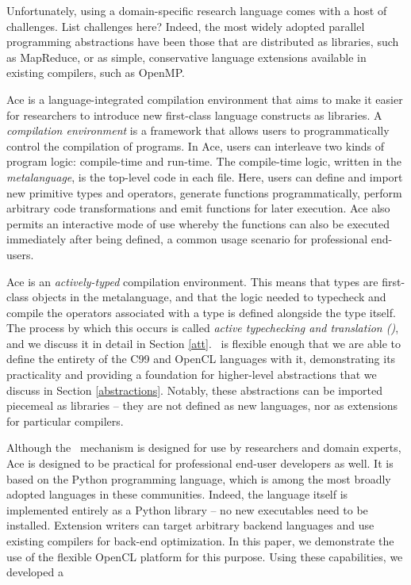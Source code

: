 \documentclass[10pt, conference, compsocconf]{IEEEtran}
\begin{document}
Unfortunately, using a domain-specific research language comes with a host of challenges. {\color{red} List challenges here?} Indeed, the most widely adopted parallel programming abstractions have been those that are distributed as libraries, such as MapReduce, or as simple, conservative language extensions available in existing compilers, such as OpenMP. 

Ace is a language-integrated compilation environment that aims to make it easier for researchers to introduce new first-class language constructs as libraries. A {\em compilation environment} is a framework that allows users to programmatically control the compilation of programs. In Ace, users can interleave two kinds of program logic: compile-time and run-time. The compile-time logic, written in the {\em metalanguage}, is the top-level code in each file. Here, users can define and import new primitive types and operators, generate functions programmatically, perform arbitrary code transformations and emit functions for later execution. Ace also permits an interactive mode of use whereby the functions can also be executed immediately after being defined, a common usage scenario for professional end-users.

Ace is an {\it actively-typed} compilation environment. This means that types are first-class objects in the metalanguage, and that the logic needed to typecheck and compile the operators associated with a type is defined alongside the type itself. The process by which this occurs is called {\em active typechecking and translation (\ATT)}, and we discuss it in detail in Section \ref{att}. \ATT~is flexible enough that we are able to define the entirety of the C99 and OpenCL languages   with it, demonstrating its practicality and providing a foundation for higher-level abstractions that we discuss in Section \ref{abstractions}. Notably, these abstractions can be imported piecemeal as libraries -- they are not defined as new languages, nor as extensions for particular compilers.

Although the \ATT~mechanism is designed for use by researchers and domain experts, Ace is designed to be practical for professional end-user developers as well. It is based on the Python programming language, which is among the most broadly adopted languages in these communities. Indeed, the language itself is implemented entirely as a Python library -- no new executables need to be installed. Extension writers can target arbitrary backend languages and use existing compilers for back-end optimization. In this paper, we demonstrate the use of the flexible OpenCL platform for this purpose. Using these capabilities, we developed a 
\end{document}
